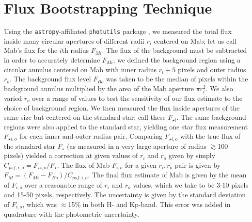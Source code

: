 \documentclass[preprint]{aastex631}
\begin{document}
\section{Flux Bootstrapping Technique}
\label{s:bootstrapping}

Using the \texttt{astropy}-affiliated \texttt{photutils} package \citep{photutils140}, we measured the total flux inside many circular apertures of different radii $r_i$ centered on Mab; let us call Mab's flux for the $i$th radius $F_{M i}$. The flux of the background must be subtracted in order to accurately determine $F_{M i}$; we defined the background region using a circular annulus centered on Mab with inner radius $r_i + 5$ pixels and outer radius $r_o$. The background flux level $F_{B o}$ was taken to be the median of pixels within the background annulus multiplied by the area of the Mab aperture $\pi r_i^2$. We also varied $r_o$ over a range of values to test the sensitivity of our flux estimate to the choice of background region. We then measured the flux inside apertures of the same size but centered on the standard star; call these $F_{\star i}$. The same background regions were also applied to the standard star, yielding one star flux measurement $F_{\star i,o}$ for each inner and outer radius pair. Comparing $F_{\star i,o}$ with the true flux of the standard star $F_\star$ (as measured in a very large aperture of radius $\gtrsim$100 pixels) yielded a correction at given values of $r_i$ and $r_o$ given by simply $C_{psf,i,o} = F_{\star i,o}/F_\star$.  The flux of Mab $F_{i,o}$ for a given $r_i, r_o$ pair is given by $F_M = (F_{M i} - F_{B o}) / C_{psf,i,o}$.
The final flux estimate of Mab is given by the mean of $F_{i,o}$ over a reasonable range of $r_i$ and $r_o$ values, which we take to be 3-10 pixels and 15-50 pixels, respectively. The uncertainty is given by the standard deviation of $F_{i,o}$, which was $\approx$15\% in both H- and Kp-band. This error was added in quadrature with the photometric uncertainty.

\end{document}
